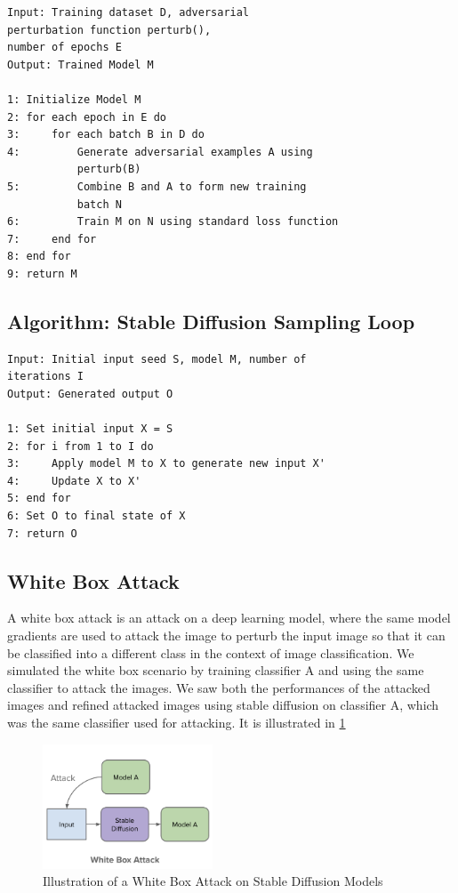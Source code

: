 \documentclass[letterpaper,twocolumn,10pt]{article}
\begin{document}
\begin{verbatim}
Input: Training dataset D, adversarial 
perturbation function perturb(), 
number of epochs E
Output: Trained Model M

1: Initialize Model M
2: for each epoch in E do
3:     for each batch B in D do
4:         Generate adversarial examples A using 
           perturb(B)
5:         Combine B and A to form new training
           batch N
6:         Train M on N using standard loss function
7:     end for
8: end for
9: return M
\end{verbatim}

\subsection{Algorithm: Stable Diffusion Sampling Loop}
\begin{verbatim}
Input: Initial input seed S, model M, number of 
iterations I
Output: Generated output O

1: Set initial input X = S
2: for i from 1 to I do
3:     Apply model M to X to generate new input X'
4:     Update X to X'
5: end for
6: Set O to final state of X
7: return O
\end{verbatim}



\subsection{White Box Attack}
A white box attack is an attack on a deep learning model, where the same model gradients are used to attack the image to perturb the input image so that it can be classified into a different class in the context of image classification. We simulated the white box scenario by training classifier A and using the same classifier to attack the images. We saw both the performances of the attacked images and refined attacked images using stable diffusion on classifier A, which was the same classifier used for attacking. It is illustrated in \ref{fig:wba}
\begin{figure}[htbp]
  \centering
  \includegraphics[width=0.45\textwidth]{wba.png}
  \caption{Illustration of a White Box Attack on Stable Diffusion Models}
  \label{fig:wba}
\end{figure}
\end{document}
